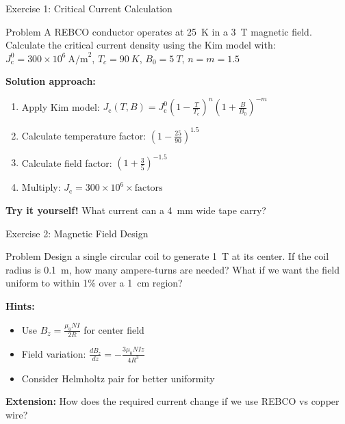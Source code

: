\documentclass[aspectratio=169,xcolor={table,dvipsnames}]{beamer}
\newcommand{\Tesla}[1]{#1~T}
\newcommand{\Kelvin}[1]{#1~K}
\newcommand{\Jc}{J_\text{c}}
\begin{document}
\begin{frame}{Exercise 1: Critical Current Calculation}
    \begin{block}{Problem}
        A REBCO conductor operates at \Kelvin{25} in a \Tesla{3} magnetic field.
        Calculate the critical current density using the Kim model with:
        $\Jc^0 = 300 \times 10^6~\text{A/m}^2$, $T_c = \Kelvin{90}$, $B_0 = \Tesla{5}$, $n = m = 1.5$
    \end{block}
    
    \vspace{0.5cm}
    \textbf{Solution approach:}
    \begin{enumerate}
        \item Apply Kim model: $\Jc(T,B) = \Jc^0 \left(1-\frac{T}{T_c}\right)^{n} \left(1+\frac{B}{B_0}\right)^{-m}$
        \item Calculate temperature factor: $\left(1-\frac{25}{90}\right)^{1.5}$
        \item Calculate field factor: $\left(1+\frac{3}{5}\right)^{-1.5}$
        \item Multiply: $\Jc = 300 \times 10^6 \times \text{factors}$
    \end{enumerate}
    
    \vspace{0.3cm}
    \textbf{Try it yourself!} What current can a 4~mm wide tape carry?
\end{frame}

\begin{frame}{Exercise 2: Magnetic Field Design}
    \begin{block}{Problem}
        Design a single circular coil to generate \Tesla{1} at its center.
        If the coil radius is 0.1~m, how many ampere-turns are needed?
        What if we want the field uniform to within 1\% over a 1~cm region?
    \end{block}
    
    \vspace{0.3cm}
    \textbf{Hints:}
    \begin{itemize}
        \item Use $B_z = \frac{\mu_0 N I}{2 R}$ for center field
        \item Field variation: $\frac{dB_z}{dz} = -\frac{3\mu_0 N I z}{4 R^3}$
        \item Consider Helmholtz pair for better uniformity
    \end{itemize}
    
    \vspace{0.3cm}
    \textbf{Extension:} How does the required current change if we use REBCO vs copper wire?
\end{frame}
\end{document}
